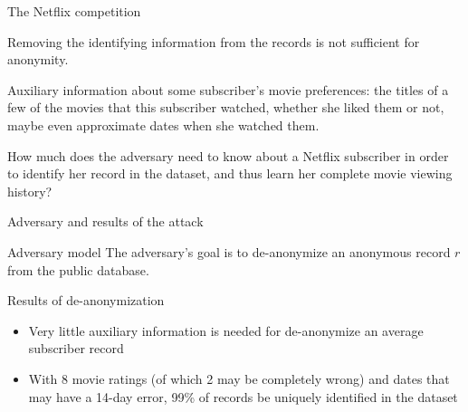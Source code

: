 \documentclass[12pt,aspectratio=169,handout]{beamer}
\begin{document}
\begin{frame}{The Netflix competition}

Removing the identifying information from the records is not sufficient for anonymity.

\pause
Auxiliary information about some subscriber’s movie preferences: the titles of a few of the movies that this subscriber watched, whether she liked them or not, maybe even approximate dates when she watched them.

\pause
How much does the adversary need to know about a Netflix subscriber in order to identify her record in the dataset, and thus learn her complete movie viewing history?


\end{frame}



\begin{frame}{Adversary and results of the attack}

\begin{block}{Adversary model}
The adversary's goal is to de-anonymize an anonymous record $r$ from the public database.
\end{block}

Results of de-anonymization

\begin{itemize}
\item Very little auxiliary information is needed for de-anonymize an average subscriber record
\item With 8 movie ratings (of which 2 may be completely wrong) and dates that may have a 14-day error, 99\% of records be uniquely identified in the dataset
\end{itemize}


\end{frame}
\end{document}
